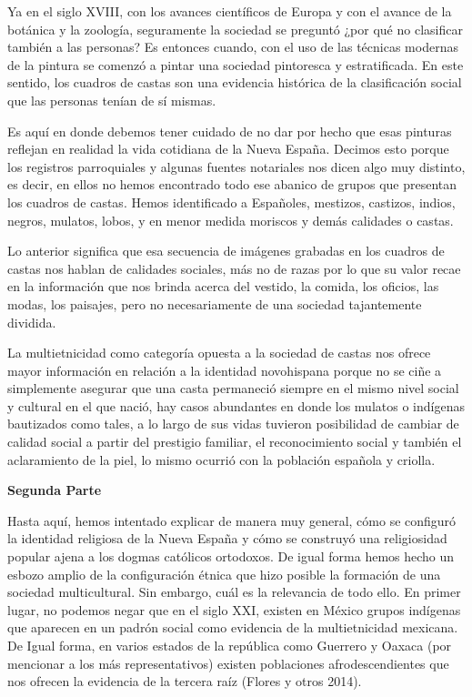 Ya en el siglo XVIII, con los avances científicos de Europa y con el avance de
la botánica y la zoología, seguramente la sociedad se preguntó ¿por qué no
clasificar también a las personas? Es entonces cuando, con el uso de las
técnicas modernas de la pintura se comenzó a pintar una sociedad pintoresca y
estratificada. En este sentido, los cuadros de castas son una evidencia
histórica de la clasificación social que las personas tenían de sí mismas. 


Es aquí en donde debemos tener cuidado de no dar por hecho que esas pinturas
reflejan en realidad la vida cotidiana de la Nueva España. Decimos esto porque
los registros parroquiales y algunas fuentes notariales nos dicen algo muy
distinto, es decir, en ellos no hemos encontrado todo ese abanico de grupos que
presentan los cuadros de castas. Hemos identificado a Españoles, mestizos,
castizos, indios, negros, mulatos, lobos, y en menor medida moriscos y demás
calidades o castas. 


Lo anterior significa que esa secuencia de imágenes grabadas en los cuadros de
castas nos hablan de calidades sociales, más no de razas por lo que su valor
recae en la información que nos brinda acerca del vestido, la comida, los
oficios, las modas, los paisajes, pero no necesariamente de una sociedad
tajantemente dividida.

\enlargethispage{1\baselineskip}
La multietnicidad como categoría opuesta a la sociedad de castas nos ofrece
mayor información en relación a la identidad novohispana porque no se ciñe a
simplemente asegurar que una casta permaneció siempre en el mismo nivel social
y cultural en el que nació, hay casos abundantes en donde los mulatos o
indígenas bautizados como tales, a lo largo de sus vidas tuvieron posibilidad
de cambiar de calidad social a partir del prestigio familiar, el reconocimiento
social y también el aclaramiento de la piel, lo mismo ocurrió con la población
española y \mbox{criolla}.


\bigskip
\textbf{Segunda Parte}

Hasta aquí, hemos intentado explicar de manera muy general, cómo se configuró la
identidad religiosa de la Nueva España y cómo se construyó una religiosidad
popular ajena a los dogmas católicos ortodoxos. De igual forma hemos hecho un
esbozo amplio de la configuración étnica que hizo posible la formación de una
sociedad multicultural. Sin embargo, cuál es la relevancia de todo ello. En
primer lugar, no podemos negar que en el siglo XXI, existen en México grupos
indígenas que aparecen en un padrón social como evidencia de la multietnicidad
mexicana. De Igual forma, en varios estados de la república como Guerrero y
Oaxaca (por mencionar a los más representativos) existen poblaciones
afrodescendientes que nos ofrecen la evidencia de la tercera raíz (Flores y
otros 2014). 


